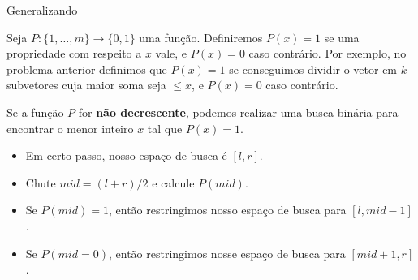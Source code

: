 \begin{frame}{Generalizando}

    Seja $P: \{1, \dots, m\} \to \{0, 1\}$ uma função. Definiremos $P(x) = 1$ se uma propriedade com respeito a $x$ vale, e $P(x) = 0$ caso contrário. Por exemplo, no problema anterior definimos que $P(x) = 1$ se conseguimos dividir o vetor em $k$ subvetores cuja maior soma seja $\leq x$, e $P(x) = 0$ caso contrário. \pause

    Se a função $P$ for {\bf não decrescente}, podemos realizar uma busca binária para encontrar o menor inteiro $x$ tal que $P(x) = 1$. \pause
    
    \begin{itemize}
        \item Em certo passo, nosso espaço de busca é $[l, r]$. \pause
        \item Chute $mid = (l+r)/2$ e calcule $P(mid)$. \pause
        \item Se $P(mid) = 1$, então restringimos nosso espaço de busca para $[l, mid-1]$. \pause
        \item Se $P(mid = 0)$, então restringimos nosse espaço de busca para $[mid+1, r]$.
    \end{itemize}
\end{frame}

